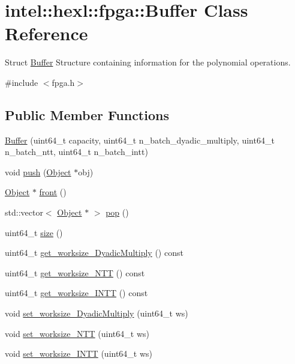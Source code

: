 \hypertarget{classintel_1_1hexl_1_1fpga_1_1Buffer}{\section{intel\-:\-:hexl\-:\-:fpga\-:\-:Buffer Class Reference}
\label{classintel_1_1hexl_1_1fpga_1_1Buffer}
}


Struct \hyperlink{classintel_1_1hexl_1_1fpga_1_1Buffer}{Buffer} Structure containing information for the polynomial operations.  




{\ttfamily \#include $<$fpga.\-h$>$}

\subsection*{Public Member Functions}
\begin{DoxyCompactItemize}
\item 
\hyperlink{classintel_1_1hexl_1_1fpga_1_1Buffer_ad6b70e490557e9c8035810efdb5fb770}{Buffer} (uint64\-\_\-t capacity, uint64\-\_\-t n\-\_\-batch\-\_\-dyadic\-\_\-multiply, uint64\-\_\-t n\-\_\-batch\-\_\-ntt, uint64\-\_\-t n\-\_\-batch\-\_\-intt)
\item 
void \hyperlink{classintel_1_1hexl_1_1fpga_1_1Buffer_a6644861e903def2ff1aef60c94f4a8f6}{push} (\hyperlink{structintel_1_1hexl_1_1fpga_1_1Object}{Object} $\ast$obj)
\item 
\hyperlink{structintel_1_1hexl_1_1fpga_1_1Object}{Object} $\ast$ \hyperlink{classintel_1_1hexl_1_1fpga_1_1Buffer_abf9ee3bd20574de86aae2dc8af3913be}{front} ()
\item 
std\-::vector$<$ \hyperlink{structintel_1_1hexl_1_1fpga_1_1Object}{Object} $\ast$ $>$ \hyperlink{classintel_1_1hexl_1_1fpga_1_1Buffer_ac60152c34dc6d5ac1275db07293fc7dc}{pop} ()
\item 
uint64\-\_\-t \hyperlink{classintel_1_1hexl_1_1fpga_1_1Buffer_a03dbef5789ed9c28bd1b63b35164ab41}{size} ()
\item 
uint64\-\_\-t \hyperlink{classintel_1_1hexl_1_1fpga_1_1Buffer_a346da8900c5d0f689de15c754ff22095}{get\-\_\-worksize\-\_\-\-Dyadic\-Multiply} () const 
\item 
uint64\-\_\-t \hyperlink{classintel_1_1hexl_1_1fpga_1_1Buffer_a7814dc29476fa0be598a8f2f99043024}{get\-\_\-worksize\-\_\-\-N\-T\-T} () const 
\item 
uint64\-\_\-t \hyperlink{classintel_1_1hexl_1_1fpga_1_1Buffer_a7147f2da3c6cbeeaf13f70d725622a87}{get\-\_\-worksize\-\_\-\-I\-N\-T\-T} () const 
\item 
void \hyperlink{classintel_1_1hexl_1_1fpga_1_1Buffer_a3ed2fb00d1e5eb733162588d30a395df}{set\-\_\-worksize\-\_\-\-Dyadic\-Multiply} (uint64\-\_\-t ws)
\item 
void \hyperlink{classintel_1_1hexl_1_1fpga_1_1Buffer_aa6c582210106d0e189630dbd47a2b613}{set\-\_\-worksize\-\_\-\-N\-T\-T} (uint64\-\_\-t ws)
\item 
void \hyperlink{classintel_1_1hexl_1_1fpga_1_1Buffer_aa9d41687d0a35d75bb12b96373a3ddf4}{set\-\_\-worksize\-\_\-\-I\-N\-T\-T} (uint64\-\_\-t ws)
\end{DoxyCompactItemize}


